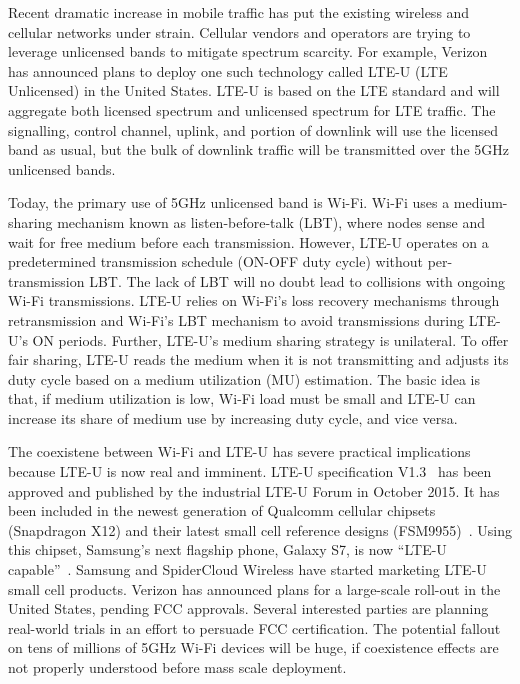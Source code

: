 Recent dramatic increase in mobile traffic has put the existing wireless and cellular networks under strain. 
Cellular vendors and operators are trying to leverage unlicensed bands to mitigate spectrum scarcity.
For example, Verizon has announced plans to deploy one such technology called LTE-U (LTE Unlicensed) in the United States.
LTE-U is based on the LTE standard and will aggregate both licensed spectrum and unlicensed spectrum for LTE traffic.
The signalling, control channel, uplink, and portion of downlink will use the licensed band as usual, but the bulk of downlink traffic will be transmitted over the 5GHz unlicensed bands.  

Today, the primary use of 5GHz unlicensed band is Wi-Fi.
Wi-Fi uses a medium-sharing mechanism known as listen-before-talk (LBT), where nodes sense and wait for free medium before each transmission.
However, LTE-U operates on a predetermined transmission schedule (ON-OFF duty cycle) without per-transmission LBT.
The lack of LBT will no doubt lead to collisions with ongoing Wi-Fi transmissions. 
LTE-U relies on Wi-Fi's loss recovery mechanisms through retransmission and Wi-Fi's LBT mechanism to avoid transmissions during LTE-U's ON periods.
Further, LTE-U's medium sharing strategy is unilateral.
To offer fair sharing, LTE-U reads the medium when it is not transmitting and adjusts its duty cycle based on a medium utilization (MU) estimation.
The basic idea is that, if medium utilization is low, Wi-Fi load must be small and LTE-U can increase its share of medium use by increasing duty cycle, and vice versa. 


The coexistene between Wi-Fi and LTE-U has severe practical implications because LTE-U is now real and imminent.
LTE-U specification V1.3~\cite{lteuforum_lteu} has been approved and published by the industrial LTE-U Forum in October 2015.
It has been included in the newest generation of Qualcomm cellular chipsets (Snapdragon X12) and their latest small cell reference designs (FSM9955)~\cite{x12}. 
Using this chipset, Samsung's next flagship phone, Galaxy S7, is now ``LTE-U capable''~\cite{s7}.
Samsung and SpiderCloud Wireless have started marketing LTE-U small cell products.
Verizon has announced plans for a large-scale roll-out in the United States, pending FCC approvals. 
Several interested parties are planning real-world trials in an effort to persuade FCC certification.
The potential fallout on tens of millions of 5GHz Wi-Fi devices will be huge, 
if coexistence effects are not properly understood before mass scale deployment. 



